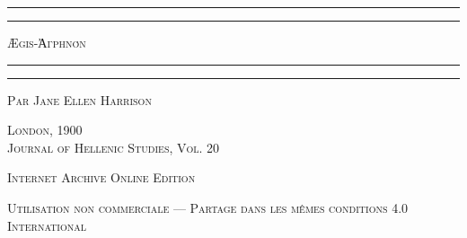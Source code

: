 \documentclass[a4paper, 11pt, oneside, polutonikogreek, french]{article}
\begin{document}
\begin{titlepage} %
	\centering %

	
	\rule{\textwidth}{1.6pt}\vspace*{-\baselineskip}\vspace*{2pt} %
	\rule{\textwidth}{0.4pt} %
	
	\vspace{1\baselineskip} %
	
	{\scshape \LARGE Ægis-Ἀγρηνόν}
	
	\vspace{1\baselineskip} %

	\rule{\textwidth}{0.4pt}\vspace*{-\baselineskip}\vspace{3.2pt} %
	\rule{\textwidth}{1.6pt} %
	
	\vspace{1\baselineskip} %
	

 	\vspace*{1\baselineskip} %

	{\scshape \Large Par Jane Ellen Harrison} %

 	\vspace*{1\baselineskip} %

        \vspace*{\fill}

	\vspace{1\baselineskip}

	{\scshape London, 1900 \\Journal of Hellenic Studies, Vol. 20}
		
	\vspace{0.5\baselineskip} %

        \scshape Internet Archive Online Edition%
	
	{\scshape\small Utilisation non commerciale --- Partage dans les mêmes conditions 4.0 International} %
\end{titlepage}
\setlength{\parskip}{1mm plus1mm minus1mm}
\clearpage
\end{document}

